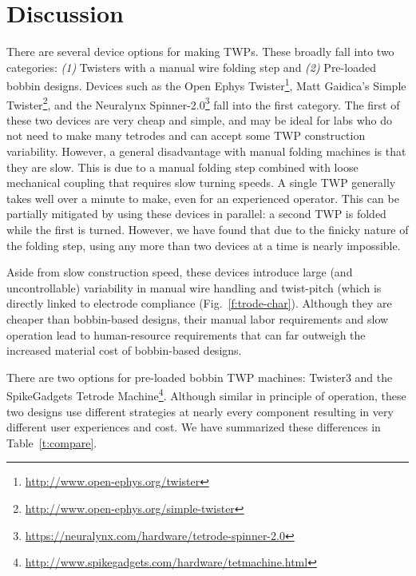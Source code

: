 \documentclass[11pt,a4paper]{article}
\begin{document}
\section{Discussion}
There are several device options for making TWPs. These broadly fall into two
categories: \textit{(1)} Twisters with a manual wire folding step and
\textit{(2)} Pre-loaded bobbin designs. Devices such as the Open Ephys
Twister\footnote{\url{http://www.open-ephys.org/twister}}, Matt Gaidica's
Simple Twister\footnote{\url{http://www.open-ephys.org/simple-twister}}, and
the Neuralynx
Spinner-2.0\footnote{\url{https://neuralynx.com/hardware/tetrode-spinner-2.0}}
fall into the first category. The first of these two devices are very cheap and
simple, and may be ideal for labs who do not need to make many tetrodes and can
accept some TWP construction variability. However, a general disadvantage with manual
folding machines is that they are slow. This is due to a  manual folding step
combined with loose mechanical coupling that requires slow turning speeds.  A
single TWP generally takes well over a minute to make, even for an experienced
operator. This can be partially mitigated by using these devices in
parallel: a second TWP is folded while the first is turned. However, we have
found that due to the finicky nature of the folding step, using any more than
two devices at a time is nearly impossible.

Aside from slow construction speed, these devices introduce large (and
uncontrollable) variability in manual wire handling and twist-pitch (which is
directly linked to electrode compliance (Fig.~\ref{f:trode-char}). Although
they are cheaper than bobbin-based designs, their manual labor requirements and
slow operation lead to human-resource requirements that can far outweigh the
increased material cost of bobbin-based designs.

There are two options for pre-loaded bobbin TWP machines: Twister3 and the
SpikeGadgets Tetrode
Machine\footnote{\url{http://www.spikegadgets.com/hardware/tetmachine.html}}.
Although similar in principle of operation, these two designs use different
strategies at nearly every component resulting in very different user
experiences and cost. We have summarized these differences in
Table~\ref{t:compare}.

\setlength{\tabcolsep}{10pt}
\end{document}
